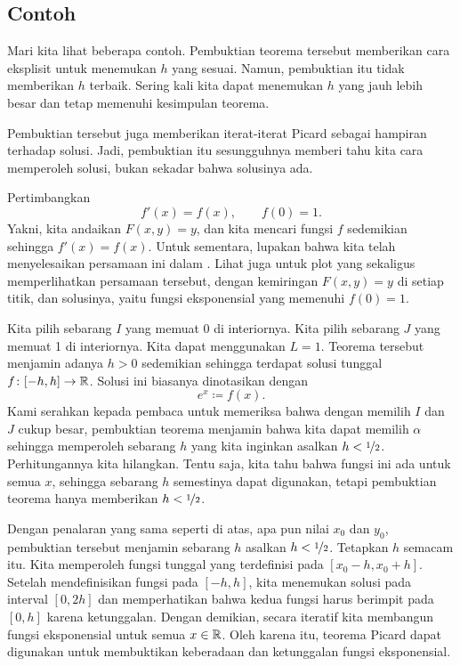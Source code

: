 \subsection{Contoh}

Mari kita lihat beberapa contoh.  Pembuktian teorema tersebut
memberikan cara eksplisit untuk menemukan $h$ yang sesuai.  Namun, pembuktian itu tidak
memberikan $h$ terbaik.  Sering kali kita dapat menemukan $h$ yang jauh lebih besar
dan tetap memenuhi kesimpulan teorema.

Pembuktian tersebut juga memberikan iterat-iterat Picard sebagai hampiran terhadap
solusi.  Jadi, pembuktian itu sesungguhnya memberi tahu kita cara memperoleh
solusi, bukan sekadar bahwa solusinya ada.

\begin{example} \label{example:picardexponential}
Pertimbangkan
\begin{equation*}
f'(x) = f(x), \qquad f(0) = 1 .
\end{equation*}
Yakni, kita andaikan $F(x,y) = y$, dan kita mencari fungsi
$f$ sedemikian sehingga $f'(x) = f(x)$.
Untuk sementara, lupakan bahwa kita telah menyelesaikan persamaan ini dalam
.  Lihat juga  untuk plot yang sekaligus memperlihatkan
persamaan tersebut, dengan
kemiringan $F(x,y)=y$ di setiap titik, dan solusinya,
yaitu fungsi eksponensial yang memenuhi $f(0)=1$.

Kita pilih sebarang $I$ yang memuat 0
di interiornya.
Kita pilih sebarang $J$ yang memuat 1 di interiornya.  Kita dapat
menggunakan $L = 1$.
Teorema tersebut menjamin adanya $h > 0$ sedemikian sehingga
terdapat solusi tunggal $f \colon [-h,h] \to {\mathbb{R}}$.  Solusi ini
biasanya dinotasikan dengan
\begin{equation*}
e^x \coloneqq f(x) .
\end{equation*}
Kami serahkan kepada pembaca untuk memeriksa bahwa dengan memilih $I$ dan $J$
cukup besar, pembuktian teorema menjamin bahwa
kita dapat memilih $\alpha$ sehingga memperoleh sebarang
$h$ yang kita inginkan asalkan $h < \nicefrac{1}{2}$.  Perhitungannya kita hilangkan.
Tentu saja, kita tahu %
bahwa fungsi ini ada
untuk semua $x$, sehingga sebarang $h$ semestinya dapat digunakan, tetapi
pembuktian teorema hanya memberikan $h < \nicefrac{1}{2}$.

Dengan penalaran yang sama seperti di atas,
apa pun nilai $x_0$ dan $y_0$,
pembuktian tersebut menjamin sebarang $h$ asalkan $h < \nicefrac{1}{2}$.
Tetapkan $h$ semacam itu.
Kita memperoleh fungsi tunggal yang terdefinisi pada $[x_0-h,x_0+h]$.  Setelah mendefinisikan
fungsi pada $[-h,h]$, kita menemukan solusi pada interval $[0,2h]$
dan memperhatikan bahwa kedua fungsi harus berimpit pada $[0,h]$ karena ketunggalan.
Dengan demikian, secara iteratif kita membangun fungsi eksponensial untuk semua $x \in {\mathbb{R}}$.
Oleh karena itu, teorema Picard dapat digunakan untuk membuktikan keberadaan dan ketunggalan
fungsi eksponensial.


\end{example}
